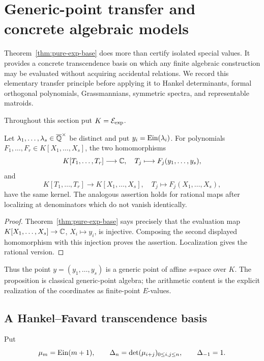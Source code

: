 \section{Generic-point transfer and concrete algebraic models}
\label{sec:generic-ein-applications}

Theorem~\ref{thm:pure-exp-base} does more than certify isolated special
values.  It provides a concrete transcendence basis on which any finite
algebraic construction may be evaluated without acquiring accidental
relations.  We record this elementary transfer principle before applying it
to Hankel determinants, formal orthogonal polynomials, Grassmannians,
symmetric spectra, and representable matroids.

Throughout this section put $K=\mathcal E_{\mathrm{exp}}$.

\begin{proposition}
\label{prop:generic-point-transfer}
Let $\lambda_1,\ldots,\lambda_s\in\overline{\mathbb Q}^\times$ be distinct and put
$y_i=\operatorname{Ein}(\lambda_i)$.  For polynomials
$F_1,\ldots,F_r\in K[X_1,\ldots,X_s]$, the two homomorphisms
\[
 K[T_1,\ldots,T_r]\longrightarrow\mathbb C,
 \quad T_j\longmapsto F_j(y_1,\ldots,y_s),
\]
and
\[
 K[T_1,\ldots,T_r]\longrightarrow K[X_1,\ldots,X_s],
 \quad T_j\longmapsto F_j(X_1,\ldots,X_s),
\]
have the same kernel.  The analogous assertion holds for rational maps
after localizing at denominators which do not vanish identically.
\end{proposition}

\begin{proof}
Theorem~\ref{thm:pure-exp-base} says precisely that the evaluation map
$K[X_1,\ldots,X_s]\to\mathbb C$, $X_i\mapsto y_i$, is injective.  Composing the
second displayed homomorphism with this injection proves the assertion.
Localization gives the rational version.
\end{proof}

Thus the point $y=(y_1,\ldots,y_s)$ is a generic point of affine
$s$-space over $K$.  The proposition is classical generic-point algebra;
the arithmetic content is the explicit realization of the coordinates as
finite-point $E$-values.

\subsection{A Hankel--Favard transcendence basis}

Put
\begin{equation}\label{eq:ein-moments}
 \mu_m=\operatorname{Ein}(m+1),\qquad
 \Delta_n=\det(\mu_{i+j})_{0\le i,j\le n},
 \qquad \Delta_{-1}=1.
\end{equation}

